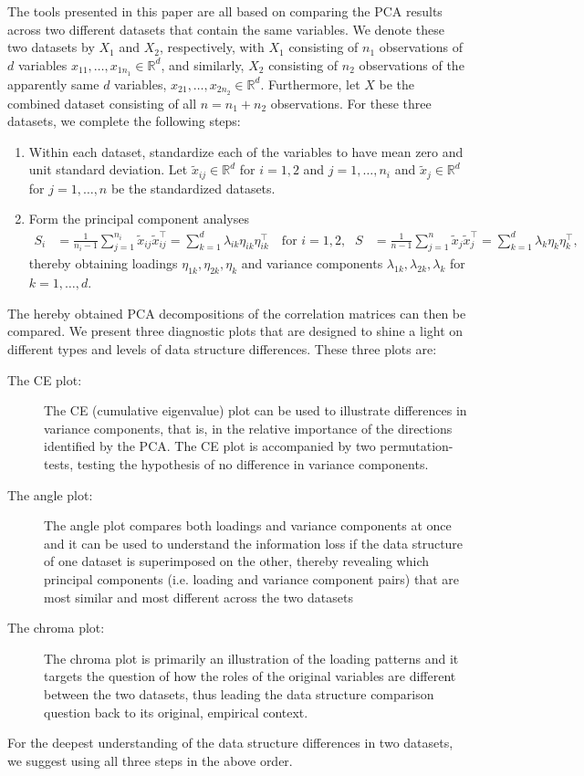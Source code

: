 \documentclass[titlepage,11pt,twoside]{article}
\newcommand{\RR}{\mathbb{R}}
\begin{document}
The tools presented in this paper are all based on comparing the PCA results across two different datasets that contain the same variables. We denote these two datasets by $X_1$ and $X_2$, respectively, with $X_1$ consisting of $n_1$ observations of $d$ variables $x_{11},\dotsc,x_{1 n_1} \in \RR^d$, and similarly, $X_2$ consisting of $n_2$ observations of the apparently same $d$ variables, $x_{21},\dotsc,x_{2 n_2} \in \RR^d$. %
Furthermore, let $X$ be the combined dataset consisting of all $n=n_1+n_2$ observations. For these %
three datasets, we complete the following steps:
\begin{enumerate}
\item Within each dataset, standardize each of the variables to have mean zero and unit standard deviation. Let $\tilde{x}_{ij} \in \RR^d$ for $i=1,2$ and $j=1,\dotsc,n_i$ and $\tilde{x}_j \in \RR^d$ for $j=1,\dotsc,n$ be the standardized datasets.
\item Form the principal component analyses
\begin{align*}
S_i &= \frac{1}{n_i-1} \sum_{j=1}^{n_i} \tilde{x}_{ij} \tilde{x}_{ij}^\top = \sum_{k=1}^d \lambda_{ik} \eta_{ik} \eta_{ik}^\top \quad \text{for $i=1,2$,} &
S &= \frac{1}{n-1} \sum_{j=1}^n \tilde{x}_j \tilde{x}_j^\top = \sum_{k=1}^d \lambda_k \eta_k \eta_k^\top,
\end{align*}
thereby obtaining loadings $\eta_{1k}, \eta_{2k}, \eta_k$ and variance components $\lambda_{1k}, \lambda_{2k}, \lambda_k$ for $k=1,\dotsc,d$.
\end{enumerate}
The hereby obtained PCA decompositions of the correlation matrices can then be compared. We present three diagnostic plots that are designed to shine a light on different types and levels of data structure differences. These three plots are:
\begin{description}
\item[The CE plot:] The CE (cumulative eigenvalue) plot can be used to illustrate differences in variance components, that is, in the relative importance of the directions identified by the PCA. The CE plot is accompanied by two permutation-tests, testing the hypothesis of no difference in variance components.
\item[The angle plot:] The angle plot compares both loadings and variance components at once and it can be used to understand the information loss if the data structure of one dataset is superimposed on the other, thereby revealing which principal components (i.e. loading and variance component pairs) that are most similar and most different across the two datasets
\item[The chroma plot:] The chroma plot is primarily an illustration of the loading patterns and it targets the question of how the roles of the original variables are different between the two datasets, thus leading the data structure comparison question back to its original, empirical context.
\end{description}
For the deepest understanding of the data structure differences in two datasets, we suggest using all three steps in the above order.
\end{document}
